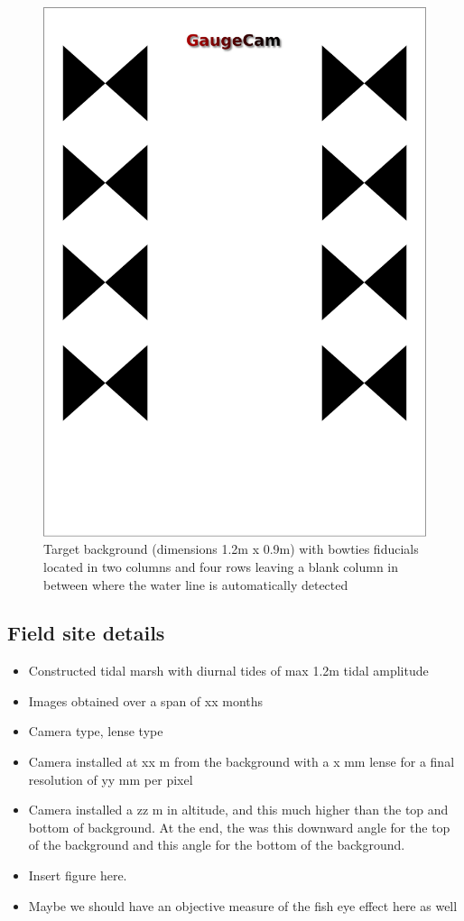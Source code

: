 \documentclass[]{article}
\providecommand{\tightlist}{%
  \setlength{\itemsep}{0pt}\setlength{\parskip}{0pt}}
\begin{document}
\begin{figure}

{\centering \includegraphics[width=0.5\linewidth]{pictures/GC_background} 

}

\caption{Target background (dimensions 1.2m x 0.9m) with bowties fiducials located in two columns and four rows leaving a blank column in between where the water line is automatically detected}\label{fig:GC-background}
\end{figure}

\hypertarget{field-site-details}{%
\subsection{Field site details}\label{field-site-details}}

\begin{itemize}
\tightlist
\item
  Constructed tidal marsh with diurnal tides of max 1.2m tidal amplitude
\item
  Images obtained over a span of xx months
\item
  Camera type, lense type
\item
  Camera installed at xx m from the background with a x mm lense for a final resolution of yy mm per pixel
\item
  Camera installed a zz m in altitude, and this much higher than the top and bottom of background. At the end, the was this downward angle for the top of the background and this angle for the bottom of the background.
\item
  Insert figure here.
\item
  Maybe we should have an objective measure of the fish eye effect here as well
\end{itemize}
\end{document}
